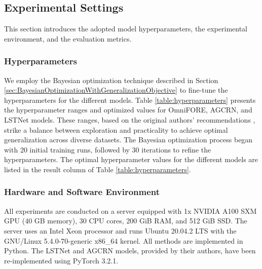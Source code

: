 \documentclass{ieeetmlcn}
\begin{document}
\subsection{Experimental Settings}
This section introduces the adopted model hyperparameters, the experimental environment, and the evaluation metrics.

\subsubsection{\textbf{Hyperparameters}}
We employ the Bayesian optimization technique described in Section \ref{sec:BayesianOptimizationWithGeneralizationObjective} to fine-tune the hyperparameters for the different models. Table \ref{table:hyperparameters} presents the hyperparameter ranges and optimized values for OmniFORE, AGCRN, and LSTNet models. These ranges, based on the original authors' recommendations \cite{AGCRN, LSTNet}, strike a balance between exploration and practicality to achieve optimal generalization across diverse datasets. The Bayesian optimization process began with 20 initial training runs, followed by 30 iterations to refine the hyperparameters. The optimal hyperparameter values for the different models are listed in the result column of Table \ref{table:hyperparameters}.

\subsubsection{\textbf{Hardware and Software Environment}}
All experiments are conducted on a server equipped with 1x NVIDIA A100 SXM GPU (40 GB memory), 30 CPU cores, 200 GiB RAM, and 512 GiB SSD. The server uses an Intel Xeon processor and runs Ubuntu 20.04.2 LTS with the GNU/Linux 5.4.0-70-generic x86\_64 kernel. All methods are implemented in Python. The LSTNet and AGCRN models, provided by their authors, have been re-implemented using PyTorch 3.2.1.
\end{document}
